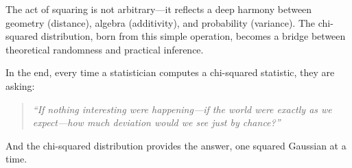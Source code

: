 \documentclass[12pt]{article}
\begin{document}
The act of squaring is not arbitrary—it reflects a deep harmony between geometry (distance), algebra (additivity), and probability (variance). The chi-squared distribution, born from this simple operation, becomes a bridge between theoretical randomness and practical inference.

In the end, every time a statistician computes a chi-squared statistic, they are asking:
\begin{quote}
    \emph{``If nothing interesting were happening—if the world were exactly as we expect—how much deviation would we see just by chance?''}
\end{quote}
And the chi-squared distribution provides the answer, one squared Gaussian at a time.
\end{document}
